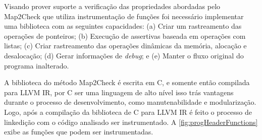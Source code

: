 Visando prover suporte a verificação das propriedades abordadas pelo Map2Check que utiliza instrumentação de funções foi necessário implementar uma biblioteca com as seguintes capacidades: 
(a) Criar um rastreamento das operações de ponteiros; 
(b) Execução de assertivas baseada em operações com listas; 
(c) Criar rastreamento das operações dinâmicas da memória, alocação e desalocação; 
(d) Gerar informações de \textit{debug}; e 
(e) Manter o fluxo original do programa inalterado.

\par
A biblioteca do método Map2Check é escrita em C, e somente então compilada para LLVM IR, por C ser uma linguagem de alto nível isso trás vantagens durante o processo de desenvolvimento, como manutenabilidade e modularização. Logo, após a compilação da biblioteca de C para LLVM IR é feito o processo de linkedição com o código analisado ser instrumentado. A \autoref{fig:progHeaderFunctions} exibe as funções que podem ser instrumentadas.

